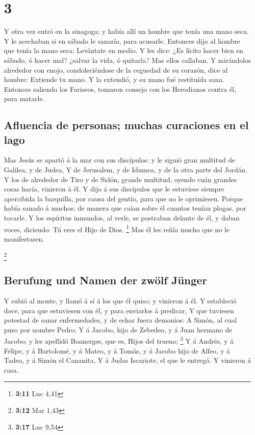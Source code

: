 \hypertarget{section-2}{%
\section{3}\label{section-2}}

 Y otra vez entró en la sinagoga; y había allí un hombre
que tenía una mano seca.  Y le acechaban si en sábado le
sanaría, para acusarle.  Entonces dijo al hombre que tenía
la mano seca: Levántate en medio.  Y les dice: ¿Es lícito
hacer bien en sábado, ó hacer mal? ¿salvar la vida, ó quitarla? Mas
ellos callaban.  Y mirándolos alrededor con enojo,
condoleciéndose de la ceguedad de su corazón, dice al hombre: Extiende
tu mano. Y la extendió, y su mano fué restituída sana. 
Entonces saliendo los Fariseos, tomaron consejo con los Herodianos
contra él, para matarle.

\hypertarget{afluencia-de-personas-muchas-curaciones-en-el-lago}{%
\subsection{Afluencia de personas; muchas curaciones en el
lago}\label{afluencia-de-personas-muchas-curaciones-en-el-lago}}

 Mas Jesús se apartó á la mar con sus discípulos: y le
siguió gran multitud de Galilea, y de Judea,  Y de
Jerusalem, y de Idumea, y de la otra parte del Jordán. Y los de
alrededor de Tiro y de Sidón, grande multitud, oyendo cuán grandes cosas
hacía, vinieron á él.  Y dijo á sus discípulos que le
estuviese siempre apercibida la barquilla, por causa del gentío, para
que no le oprimiesen.  Porque había sanado á muchos; de
manera que caían sobre él cuantos tenían plagas, por tocarle.
 Y los espíritus inmundos, al verle, se postraban delante
de él, y daban voces, diciendo: Tú eres el Hijo de Dios. \footnote{\textbf{3:11}
  Luc 4,41}  Mas él les reñía mucho que no le
manifestasen.

\footnote{\textbf{3:12} Mar 1,43}

\hypertarget{berufung-und-namen-der-zwuxf6lf-juxfcnger}{%
\subsection{Berufung und Namen der zwölf
Jünger}\label{berufung-und-namen-der-zwuxf6lf-juxfcnger}}

 Y subió al monte, y llamó á sí á los que él quiso; y
vinieron á él.  Y estableció doce, para que estuviesen
con él, y para enviarlos á predicar,  Y que tuviesen
potestad de sanar enfermedades, y de echar fuera demonios:
 A Simón, al cual puso por nombre Pedro; 
Y á Jacobo, hijo de Zebedeo, y á Juan hermano de Jacobo; y les apellidó
Boanerges, que es, Hijos del trueno; \footnote{\textbf{3:17} Luc 9,54}
 Y á Andrés, y á Felipe, y á Bartolomé, y á Mateo, y á
Tomás, y á Jacobo hijo de Alfeo, y á Tadeo, y á Simón el Cananita,
 Y á Judas Iscariote, el que le entregó. Y vinieron á
casa.

